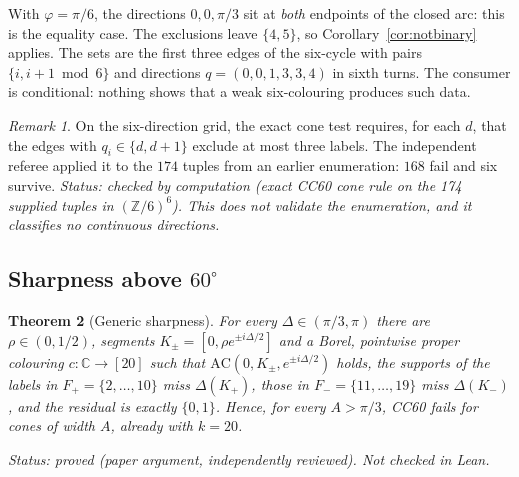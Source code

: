 \documentclass[11pt]{article}
\newtheorem{theorem}{Theorem}[section]
\theoremstyle{definition}
\theoremstyle{remark}
\newtheorem{remark}[theorem]{Remark}
\begin{document}
With $\varphi=\pi/6$, the directions $0,0,\pi/3$ sit at \emph{both}
endpoints of the closed arc: this is the equality case. The exclusions
leave $\{4,5\}$, so Corollary~\ref{cor:notbinary} applies. The sets are the
first three edges of the six-cycle with pairs $\{i,i+1\bmod6\}$ and
directions $q=(0,0,1,3,3,4)$ in sixth turns. The consumer is conditional:
nothing shows that a weak six-colouring produces such data.

\begin{remark}
On the six-direction grid, the exact cone test requires, for each $d$, that
the edges with $q_i\in\{d,d+1\}$ exclude at most three labels. The
independent referee applied it to the $174$ tuples from an earlier
enumeration: $168$ fail and six survive. \emph{Status: checked by
computation (exact CC60 cone rule on the 174 supplied tuples in
$(\mathbb Z/6)^6$). This does not validate the enumeration, and it
classifies no continuous directions.}
\end{remark}

\subsection{Sharpness above $60^\circ$}
\label{sec:cc60-sharp}

\begin{theorem}[Generic sharpness]\label{thm:sharp}
For every $\Delta\in(\pi/3,\pi)$ there are $\rho\in(0,1/2)$, segments
$K_\pm=[0,\rho e^{\pm i\Delta/2}]$ and a Borel, pointwise proper colouring
$c:\mathbb C\to[20]$ such that $\mathrm{AC}(0,K_\pm,e^{\pm i\Delta/2})$ holds,
the supports of the labels in $F_+=\{2,\dots,10\}$ miss $\Delta(K_+)$, those
in $F_-=\{11,\dots,19\}$ miss $\Delta(K_-)$, and the residual is exactly
$\{0,1\}$. Hence, for every $A>\pi/3$, CC60 fails for cones of width $A$,
already with $k=20$.
\end{theorem}
\noindent\emph{Status: proved (paper argument, independently reviewed). Not
checked in Lean.}
\end{document}
